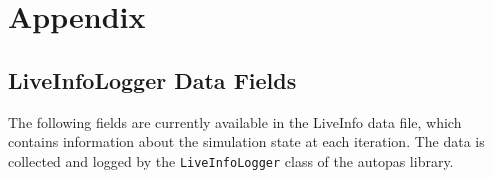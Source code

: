 \chapter{Appendix}

\printglossaries

\newpage

\section{LiveInfoLogger Data Fields}
\label{des:liveinfodatafields}

The following fields are currently available in the LiveInfo data file, which contains information about the simulation state at each iteration. The data is collected and logged by the \texttt{LiveInfoLogger} class of the \gls{autopas} library.

